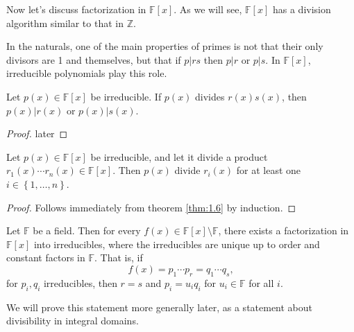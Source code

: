 Now let's discuss factorization in $\mathbb{F}[x]$. As we will see, $\mathbb{F} [x]$ has a division algorithm similar to that in $\mathbb{Z} $.

In the naturals, one of the main properties of primes is not that their only divisors are 1 and themselves, but that if $p|rs$ then $p|r$ or $p|s$. In $\mathbb{F} [x]$, irreducible polynomials play this role.
\begin{theorem}\label{thm:1.6}
	Let $p(x)\in\mathbb{F} [x]$ be irreducible. If $p(x)$ divides $r(x)s(x)$, then $p(x)|r(x)$ or $p(x)|s\left(x \right) $.
\end{theorem}
\begin{proof}
	later
\end{proof}
\begin{corollary}\label{cor:1.6}
	Let $p(x)\in\mathbb{F} [x]$ be irreducible, and let it divide a product $r_1(x)\cdots r_n(x) \in\mathbb{F} [x]$. Then $p(x)$ divide $r_i\left( x \right) $ for at least one $i\in \left\{1, \ldots, n \right\} $.
\end{corollary}
\begin{proof}
	Follows immediately from theorem \ref{thm:1.6} by induction.
\end{proof}
\begin{theorem}\label{thm:1.7}
	Let $\mathbb{F} $ be a field. Then for every $f(x)\in\mathbb{F} [x]\setminus \mathbb{F} $, there exists a factorization in $\mathbb{F} [x]$ into irreducibles, where the irreducibles are unique up to order and constant factors in $\mathbb{F} $. That is, if
	\[
		f(x)=p_1 \cdots  p_r = q_1 \cdots q_s,
	\]
	for $p_i,q_i$ irreducibles, then $r=s$ and $p_i=u_iq_i$ for $u_i\in\mathbb{F} $ for all $i$.
\end{theorem}
We will prove this statement more generally later, as a statement about divisibility in integral domains.
